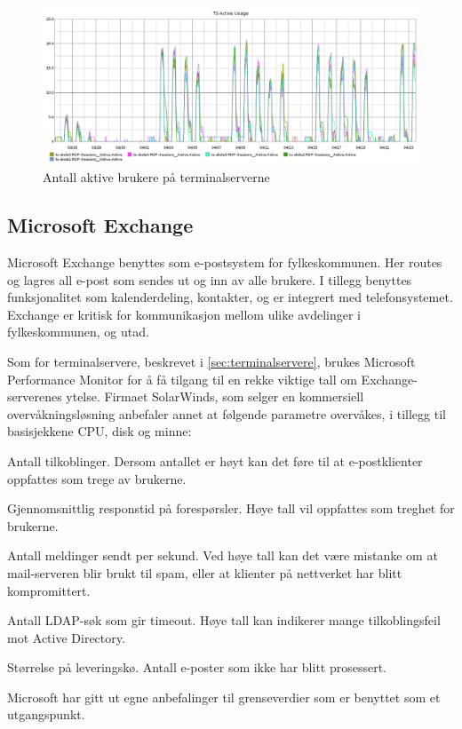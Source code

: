 \begin{figure}[H]
	\centering
	\includegraphics[width=1.0\textwidth]{img/ts-skole-usage-inv}
	\caption{Antall aktive brukere på terminalserverne}
	\label{ts-skole-usage}
\end{figure}

\subsection{Microsoft Exchange}
Microsoft Exchange benyttes som e-postsystem for fylkeskommunen. Her routes og lagres all e-post som sendes ut og inn av alle brukere. I tillegg benyttes funksjonalitet som kalenderdeling, kontakter, og er integrert med telefonsystemet. Exchange er kritisk for kommunikasjon mellom ulike avdelinger i fylkeskommunen, og utad. 

Som for terminalservere, beskrevet i \ref{sec:terminalservere}, brukes Microsoft Performance Monitor for å få tilgang til en rekke viktige tall om Exchange-serverenes ytelse. Firmaet SolarWinds, som selger en kommersiell overvåkningsløsning anbefaler annet at følgende parametre overvåkes\cite{exchange}, i tillegg til basisjekkene CPU, disk og minne:
\begin{itemize*}
	\item Antall tilkoblinger. Dersom antallet er høyt kan det føre til at e-postklienter oppfattes som trege av brukerne.
	\item Gjennomsnittlig responstid på forespørsler. Høye tall vil oppfattes som treghet for brukerne.
	\item Antall meldinger sendt per sekund. Ved høye tall kan det være mistanke om at mail-serveren blir brukt til spam, eller at klienter på nettverket har blitt kompromittert.
	\item Antall LDAP-søk som gir timeout. Høye tall kan indikerer mange tilkoblingsfeil mot Active Directory.
	\item Størrelse på leveringskø. Antall e-poster som ikke har blitt prosessert.
\end{itemize*}
Microsoft har gitt ut egne anbefalinger til grenseverdier som er benyttet som et utgangspunkt\cite{exchangethresholds}.

